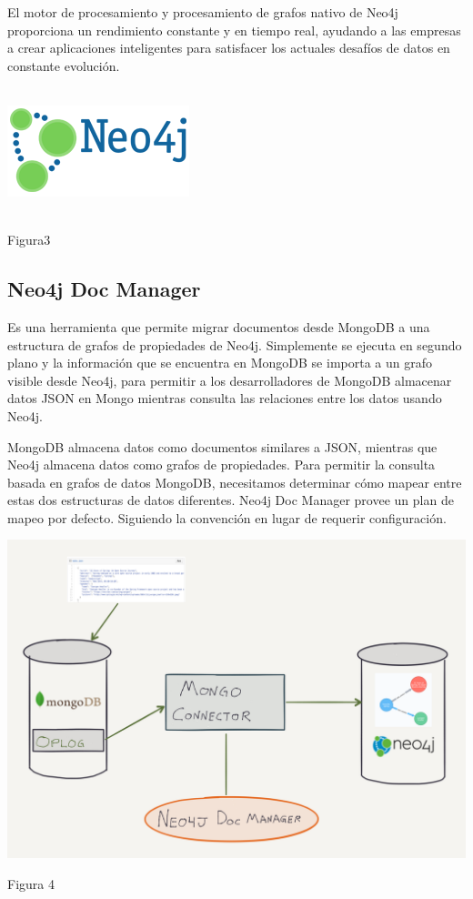 \documentclass[conference]{IEEEtran}
\begin{document}
El motor de procesamiento y procesamiento de grafos nativo de Neo4j proporciona un rendimiento constante y en tiempo real, ayudando a las empresas a crear aplicaciones inteligentes para satisfacer los actuales desafíos de datos en constante evolución.\cite{neo}
\\\\
\begin{flushright}
\includegraphics[scale=2.5]{Imagenes/neo4j.png}
\end{flushright}
\centering
\\Figura3
\subsection{Neo4j Doc Manager}
Es una herramienta que permite migrar documentos desde MongoDB a una estructura de grafos de propiedades de Neo4j. Simplemente se ejecuta en segundo plano y la informaci\'on que se encuentra en MongoDB se importa a un grafo visible desde Neo4j, para permitir a los desarrolladores de MongoDB almacenar datos JSON en Mongo mientras consulta las relaciones entre los datos usando Neo4j.

MongoDB almacena datos como documentos similares a JSON, mientras que Neo4j almacena datos como grafos de propiedades. Para permitir la consulta basada en grafos de datos MongoDB, necesitamos determinar c\'omo mapear entre estas dos estructuras de datos diferentes. Neo4j Doc Manager provee un plan de mapeo por defecto. Siguiendo la convenci\'on en lugar de requerir configuraci\'on.\cite{doc}
\\
\begin{flushright}
\includegraphics[scale=0.25]{Imagenes/mongo_connector.png}\\
\end{flushright}
\centering
Figura 4
\end{document}
